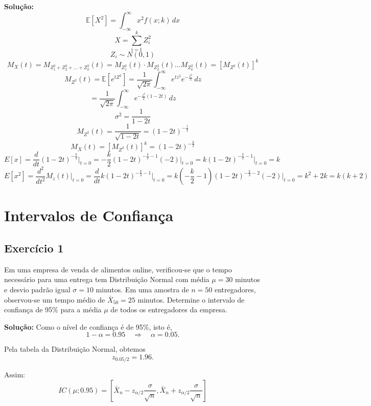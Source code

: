 \documentclass{article}
\begin{document}
\vspace{0.5cm}
\textbf{Solução:} 
    $$
    \mathbb{E}[X^2] = \int_{-\infty}^{\infty} x^2 f(x; k) \, dx
    $$
    $$
    X = \sum_{i=1}^k Z_i^2
    $$
    $$
    Z_i \sim N(0,1)
    $$
    $$
    M_X(t) = M_{Z_1^2 + Z_2^2 + \dots + Z_k^2}(t) = M_{Z_1^2}(t) \cdot M_{Z_2^2}(t) \dots M_{Z_k^2}(t) = [ M_{Z^2}(t) ]^k
    $$
    $$
    M_{Z^2}(t) = \mathbb{E} \left[ e^{t Z^2} \right] = \frac{1}{\sqrt{2\pi}} \int_{-\infty}^{\infty} e^{t z^2} e^{-\frac{z^2}{2}} \, dz
    $$
    $$
    = \frac{1}{\sqrt{2\pi}} \int_{-\infty}^{\infty} e^{ -\frac{z^2}{2} (1 - 2t)} \, dz
    $$
    $$
    \sigma^2 
    = \frac{1}{1-2t}
    $$
    $$
    M_{Z^2}(t) 
    = \frac{1}{\sqrt{1-2t}}
    = (1-2t)^{-\frac{1}{2}}
    $$
    $$
    M_X(t) 
    = [M_{Z^2}(t)]^k
    = (1-2t)^{-\frac{k}{2}}
    $$
    $$
    E[x] = \frac{d}{dt} (1 - 2t)^{-\frac{k}{2}} \bigg|_{t=0} 
    = -\frac{k}{2} (1 - 2t)^{-\frac{k}{2}-1}(-2) \bigg|_{t=0} 
    = k (1 - 2t)^{-\frac{k}{2}-1} \bigg|_{t=0} 
    = k
    $$
    $$
    E[x^2] = \frac{d^2}{dt^2} M_z(t) \bigg|_{t=0}
    = \frac{d}{dt} k (1 - 2t)^{-\frac{k}{2}-1} \bigg|_{t=0}
    = k \left(-\frac{k}{2} - 1\right) (1 - 2t)^{-\frac{k}{2}-2}(-2) \bigg|_{t=0}
    = k^2 + 2k = k(k+2)
    $$

\section{Intervalos de Confiança}
\subsection{Exercício 1}
Em uma empresa de venda de alimentos online, verificou-se que o tempo necessário para uma entrega tem Distribuição Normal com média $\mu = 30$ minutos e desvio padrão igual $\sigma = 10$ minutos. 
Em uma amostra de $n = 50$ entregadores, observou-se um tempo médio de $\bar{X}_{50} = 25$ minutos. 
Determine o intervalo de confiança de 95\% para a média $\mu$ de todos os entregadores da empresa.

\vspace{0.5cm}
\textbf{Solução:}
Como o nível de confiança é de 95\%, isto é,
    $$
    1 - \alpha = 0.95 \quad \Rightarrow \quad \alpha = 0.05.
    $$

Pela tabela da Distribuição Normal, obtemos
    $$
    z_{0.05/2} = 1.96.
    $$

Assim:
    $$
    IC(\mu; 0.95) =
    \left[
    \bar{X}_n - z_{\alpha/2}\frac{\sigma}{\sqrt{n}},
    \bar{X}_n + z_{\alpha/2}\frac{\sigma}{\sqrt{n}}
    \right]
    $$
\end{document}
